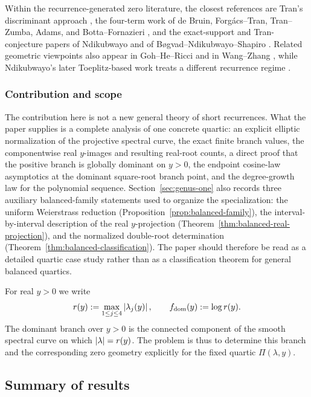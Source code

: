 Within the recurrence-generated zero literature, the closest references are Tran's discriminant approach \cite{Tran2014,Tran2015}, the four-term work of de Bruin, Forg\'acs--Tran, Tran--Zumba, Adams, and Botta--Fornazieri \cite{deBruin1984,ForgacsTran2016,ForgacsTran2017,ForgacsTran2020,TranZumba2018,TranZumba2021,Adams2020,BottaFornazieri2023}, and the exact-support and Tran-conjecture papers of Ndikubwayo and of B{\o}gvad--Ndikubwayo--Shapiro \cite{Ndikubwayo2020,BogvadNdikubwayoShapiro2020}.
Related geometric viewpoints also appear in Goh--He--Ricci and in Wang--Zhang \cite{GohHeRicci2009,WangZhang2021}, while Ndikubwayo's later Toeplitz-based work treats a different recurrence regime \cite{Ndikubwayo2022}.

\subsubsection*{Contribution and scope}

The contribution here is not a new general theory of short recurrences.
What the paper supplies is a complete analysis of one concrete quartic:
an explicit elliptic normalization of the projective spectral curve, the exact finite branch values, the componentwise real \(y\)-images and resulting real-root counts, a direct proof that the positive branch is globally dominant on \(y>0\), the endpoint cosine-law asymptotics at the dominant square-root branch point, and the degree-growth law for the polynomial sequence.
Section~\ref{sec:genus-one} also records three auxiliary balanced-family statements used to organize the specialization: the uniform Weierstrass reduction (Proposition~\ref{prop:balanced-family}), the interval-by-interval description of the real \(y\)-projection (Theorem~\ref{thm:balanced-real-projection}), and the normalized double-root determination (Theorem~\ref{thm:balanced-classification}).
The paper should therefore be read as a detailed quartic case study rather than as a classification theorem for general balanced quartics.

For real $y>0$ we write
\[
r(y):=\max_{1\le j\le 4}\left\lvert \lambda_j(y)\right\rvert,
\qquad
f_{\mathrm{dom}}(y):=\log r(y).
\]
The dominant branch over $y>0$ is the connected component of the smooth spectral curve on which $\left\lvert \lambda\right\rvert=r(y)$.
The problem is thus to determine this branch and the corresponding zero geometry explicitly for the fixed quartic \(\Pi(\lambda,y)\).

\subsection{Summary of results}

